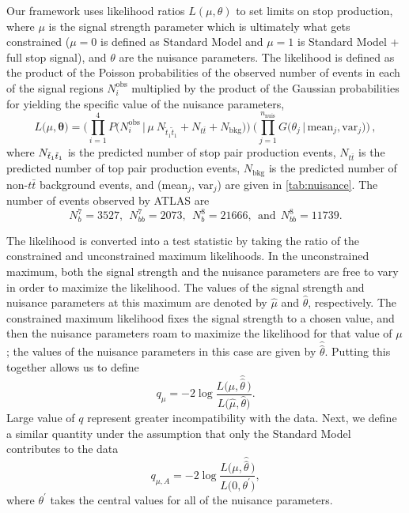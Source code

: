 \documentclass[a4paper,12pt]{article}
\def\stopone{\ensuremath{\mathchoice%
      {\displaystyle\raise.0ex\hbox{$\displaystyle\tilde t_1$}}%
         {\textstyle\raise-.2ex\hbox{$\textstyle\tilde t_1$}}%
       {\scriptstyle\raise.0ex\hbox{$\scriptstyle\tilde t_1$}}%
 {\scriptscriptstyle\raise.0ex\hbox{$\scriptscriptstyle\tilde t_1$}}}}
\begin{document}
Our framework uses likelihood ratios $L(\mu,\theta)$ to set limits on stop production, where $\mu$ is the signal strength parameter which is ultimately what gets constrained ($\mu=0$ is defined as Standard Model and $\mu=1$ is Standard Model + full stop signal), and $\theta$ are the nuisance parameters. The likelihood is defined as the product of the Poisson probabilities of the observed number of events in each of the signal regions $N_i^\text{obs}$ multiplied by the product of the Gaussian probabilities for yielding the specific value of the nuisance parameters, 
\begin{equation}
L\big(\mu, \mathbf{\theta} \big) = \Bigg(\prod_{i=1}^4 P\Big(N_i^{\text{obs}} \,\Big|\, \mu~N_{\tilde{t}_1\tilde{t}_1} + N_{t\bar{t}} + N_\text{bkg} \Big) \Bigg) ~ \Bigg( \prod_{j=1}^{n_{\text{nuis}}} G \Big( \theta_j \,\Big|\, \text{mean}_j, \text{var}_j \Big) \Bigg)\,,
\end{equation}
where $N_{\stopone \stopone}$ is the predicted number of stop pair production events, $N_{t\bar{t}}$ is the predicted number of top pair production events, $N_\text{bkg}$ is the predicted number of non-$t\bar{t}$ background events, and (mean$_j$, var$_j$) are given in \cref{tab:nuisance}.
The number of events observed by ATLAS are
\begin{equation}
N_b^7 = 3527, ~~N_{bb}^7 = 2073, ~~ N_b^8 = 21666, ~~\text{and}~~ N_{bb}^8 = 11739.
\end{equation} 

The likelihood is converted into a test statistic by taking the ratio of the constrained and unconstrained maximum likelihoods. In the unconstrained maximum, both the signal strength and the nuisance parameters are free to vary in order to maximize the likelihood. The values of the signal strength and nuisance parameters at this maximum are denoted by $\hat{\mu}$ and $\hat{\theta}$, respectively. The constrained maximum likelihood fixes the signal strength to a chosen value, and then the nuisance parameters roam to maximize the likelihood for that value of $\mu$; the values of the nuisance parameters in this case are given by $\hat{\hat{\theta}}$. Putting this together allows us to define
\begin{equation}
q_{\mu} = -2 \log  \frac{L\bigg(\mu, \hat{\hat{\theta}}\,\bigg)}{L\Big(\hat{\mu}, \hat{\theta} \Big)} .
\end{equation}
Large value of $q$ represent greater incompatibility with the data.  Next, we define a similar quantity under the assumption that only the Standard Model contributes to the data
\begin{equation}
q_{\mu,A} = -2 \log \frac{L\bigg(\mu, \hat{\hat{\theta}}\, \bigg)}{L\Big(0,\theta^{\prime} \Big)},
\end{equation}
where $\theta^{\prime}$ takes the central values for all of the nuisance parameters. 
\end{document}

